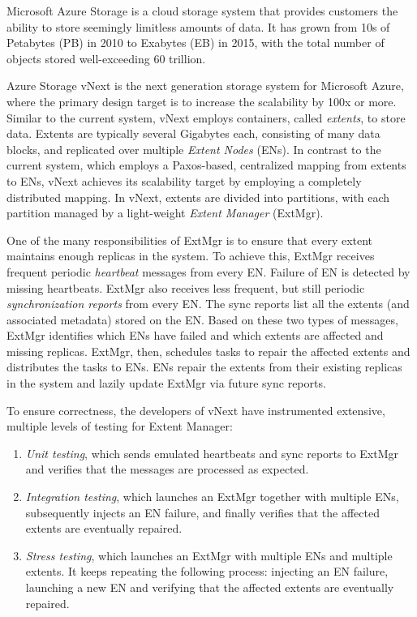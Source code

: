 Microsoft Azure Storage is a cloud storage system that provides customers the ability to store seemingly limitless amounts of data. It has grown from 10s of Petabytes (PB) in 2010 to Exabytes (EB) in 2015, with the total number of objects stored well-exceeding 60 trillion.

Azure Storage vNext is the next generation storage system for Microsoft Azure, where the primary design target is to increase the scalability by 100x or more. Similar to the current system, vNext employs containers, called {\em extents}, to store data. Extents are typically several Gigabytes each, consisting of many data blocks, and replicated over multiple {\em Extent Nodes} (ENs). In contrast to the current system, which employs a Paxos-based, centralized mapping from extents to ENs, vNext achieves its scalability target by employing a completely distributed mapping. In vNext, extents are divided into partitions, with each partition managed by a light-weight {\em Extent Manager} (ExtMgr).

One of the many responsibilities of ExtMgr is to ensure that every extent maintains enough replicas in the system. To achieve this, ExtMgr receives frequent periodic \emph{heartbeat} messages from every EN. Failure of EN is detected by missing heartbeats. ExtMgr also receives less frequent, but still periodic {\em synchronization reports} from every EN. The sync reports list all the extents (and associated metadata) stored on the EN. Based on these two types of messages, ExtMgr identifies which ENs have failed and which extents are affected and missing replicas. ExtMgr, then, schedules tasks to repair the affected extents and distributes the tasks to ENs. ENs repair the extents from their existing replicas in the system and lazily update ExtMgr via future sync reports.

To ensure correctness, the developers of vNext have instrumented extensive, multiple levels of testing for Extent Manager:
\begin{enumerate}
\item \emph{Unit testing}, which sends emulated heartbeats and sync reports to ExtMgr and verifies that the messages are processed as expected.

\item \emph{Integration testing}, which launches an ExtMgr together with multiple ENs, subsequently injects an EN failure, and finally verifies that the affected extents are eventually repaired.

\item \emph{Stress testing}, which launches an ExtMgr with multiple ENs and multiple extents. It keeps repeating the following process: injecting an EN failure, launching a new EN and verifying that the affected extents are eventually repaired.
\end{enumerate}

